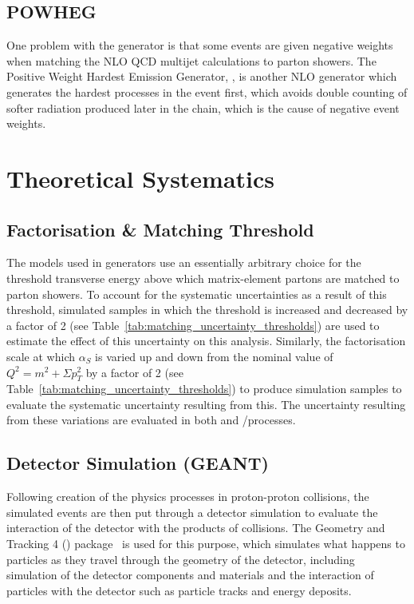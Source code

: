 \subsection{POWHEG}
\label{ss:powheg}
One problem with the \MCATNLO generator is that some events are given negative weights when matching the NLO
QCD multijet calculations to parton showers.  The Positive Weight Hardest Emission Generator, \POWHEG
\cite{powheg_Frixione, powheg_Nason, powheg_Alioli}, is another NLO generator which generates the hardest
processes in the event first, which avoids double counting of softer radiation produced later in the chain,
which is the cause of negative event weights.


\section{Theoretical Systematics}
\label{s:Theoretical Systematics}
\subsection{Factorisation \& Matching Threshold}
\label{ss:factorisation_and_matching_threshold}
The models used in generators use an essentially arbitrary choice for the threshold transverse energy above
which matrix-element partons are matched to parton showers. To account for the systematic uncertainties as a result
of this threshold, simulated samples in which the threshold is increased and decreased by a factor of 2 (see
Table~\ref{tab:matching_uncertainty_thresholds}) are used to estimate the effect of this uncertainty on this
analysis. Similarly, the factorisation scale at which $\alpha_{S}$ is varied up and down from the nominal
value of $Q^{2} = m^{2} + \Sigma p_{T}^{2}$ by a factor of 2 (see Table~\ref{tab:matching_uncertainty_thresholds}) to
produce simulation samples to evaluate the systematic uncertainty resulting from this. The uncertainty
resulting from these variations are evaluated in both \ttbar and \W/\ZpJets processes.



\subsection{Detector Simulation (GEANT)}
\label{ss:detector_simulation}
Following creation of the physics processes in proton-proton collisions, the simulated events are then put
through a detector simulation to evaluate the interaction of the detector with the products of collisions. The
Geometry and Tracking 4 (\GEANTfour) package~\cite{Agostinelli:2002hh,Allison:2006ve} is used for this
purpose, which simulates what happens to particles as they travel through the geometry of the detector,
including simulation of the detector components and materials and the interaction of particles with the
detector such as particle tracks and energy deposits.